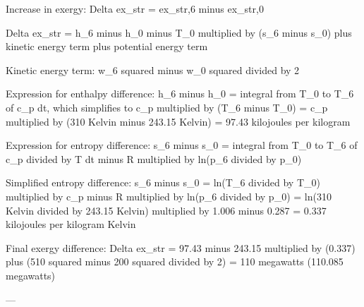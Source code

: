 Increase in exergy:  
Delta ex_str = ex_str,6 minus ex_str,0  

Delta ex_str = h_6 minus h_0 minus T_0 multiplied by (s_6 minus s_0) plus kinetic energy term plus potential energy term  

Kinetic energy term:  
w_6 squared minus w_0 squared divided by 2  

Expression for enthalpy difference:  
h_6 minus h_0 = integral from T_0 to T_6 of c_p dt, which simplifies to c_p multiplied by (T_6 minus T_0) = c_p multiplied by (310 Kelvin minus 243.15 Kelvin) = 97.43 kilojoules per kilogram  

Expression for entropy difference:  
s_6 minus s_0 = integral from T_0 to T_6 of c_p divided by T dt minus R multiplied by ln(p_6 divided by p_0)  

Simplified entropy difference:  
s_6 minus s_0 = ln(T_6 divided by T_0) multiplied by c_p minus R multiplied by ln(p_6 divided by p_0) = ln(310 Kelvin divided by 243.15 Kelvin) multiplied by 1.006 minus 0.287 = 0.337 kilojoules per kilogram Kelvin  

Final exergy difference:  
Delta ex_str = 97.43 minus 243.15 multiplied by (0.337) plus (510 squared minus 200 squared divided by 2) = 110 megawatts (110.085 megawatts)  

---